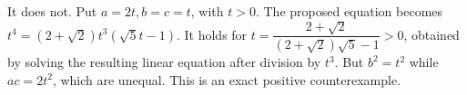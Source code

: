 It does not. Put $a=2t,b=c=t$, with $t>0$. The proposed equation becomes $t^4=(2+\sqrt2)t^3(\sqrt5t-1)$. It holds for $t=\dfrac{2+\sqrt2}{(2+\sqrt2)\sqrt5-1}>0$, obtained by solving the resulting linear equation after division by $t^3$. But $b^2=t^2$ while $ac=2t^2$, which are unequal. This is an exact positive counterexample.

